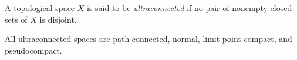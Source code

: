 \documentclass[12pt]{article}
\begin{document}
A topological space $X$ is said to be {\em ultraconnected} if no pair of nonempty closed sets of $X$ is disjoint.

All ultraconnected spaces are path-connected, normal, limit point compact, and pseudocompact.
\end{document}
